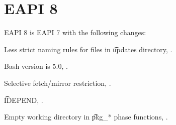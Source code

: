 \section{EAPI 8}

EAPI 8 is EAPI 7 with the following changes:

\begin{compactitem}
\item Less strict naming rules for files in \t{updates} directory, .
\item Bash version is 5.0, .
\item Selective fetch/mirror restriction, .
\item \t{IDEPEND}, .
\item Empty working directory in \t{pkg_*} phase functions, .
\end{compactitem}



